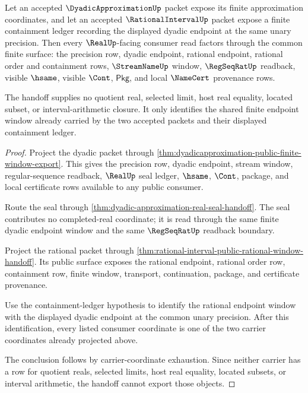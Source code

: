 \begin{theorem}\label{thm:dyadic-approximation-rational-interval-window-handoff}
Let an accepted $\DyadicApproximationUp$ packet expose its finite
approximation coordinates, and let an accepted $\RationalIntervalUp$ packet
expose a finite containment ledger recording the displayed dyadic endpoint at
the same unary precision. Then every $\RealUp$-facing consumer read factors
through the common finite surface: the precision row, dyadic endpoint, rational
endpoint, rational order and containment rows, $\StreamNameUp$ window,
$\RegSeqRatUp$ readback, visible $\hsame$, visible $\Cont$, $\mathsf{Pkg}$,
and local $\NameCert$ provenance rows.

The handoff supplies no quotient real, selected limit, host real equality,
located subset, or interval-arithmetic closure. It only identifies the shared
finite endpoint window already carried by the two accepted packets and their
displayed containment ledger.
\end{theorem}
\begin{proof}
Project the dyadic packet through
\autoref{thm:dyadicapproximation-public-finite-window-export}. This gives the
precision row, dyadic endpoint, stream window, regular-sequence readback,
$\RealUp$ seal ledger, $\hsame$, $\Cont$, package, and local certificate rows
available to any public consumer.

Route the seal through
\autoref{thm:dyadic-approximation-real-seal-handoff}. The seal contributes no
completed-real coordinate; it is read through the same finite dyadic endpoint
window and the same $\RegSeqRatUp$ readback boundary.

Project the rational packet through
\autoref{thm:rational-interval-public-rational-window-handoff}. Its public
surface exposes the rational endpoint, rational order row, containment row,
finite window, transport, continuation, package, and certificate provenance.

Use the containment-ledger hypothesis to identify the rational endpoint window
with the displayed dyadic endpoint at the common unary precision. After this
identification, every listed consumer coordinate is one of the two carrier
coordinates already projected above.

The conclusion follows by carrier-coordinate exhaustion. Since neither carrier
has a row for quotient reals, selected limits, host real equality, located
subsets, or interval arithmetic, the handoff cannot export those objects.
\end{proof}

